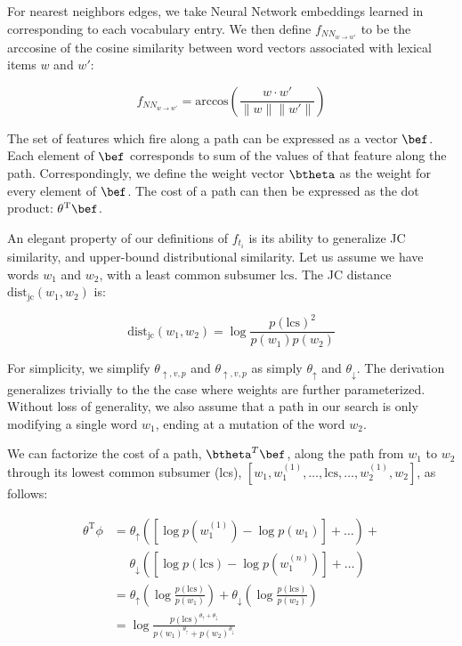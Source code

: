 For nearest neighbors edges, we take Neural Network embeddings learned
  in  corresponding to each vocabulary entry.
We then define $f_{NN_{w \rightarrow w'}}$
  to be the arccosine of the cosine similarity between word vectors
  associated with lexical items $w$ and $w'$:

\begin{equation*}
  f_{NN_{w \rightarrow w'}}
    = \textrm{arccos} \left( \frac{w \cdot w'}{\|w\| \|w'\|} \right)
\end{equation*}

The set of features which fire along a path
  can be expressed as a vector $\bef$.
Each element of $\bef$ corresponds to sum of the values of that
  feature along the path.
Correspondingly, we define the weight vector $\btheta$ as the
  weight for every element of $\bef$.
The cost of a path can then be expressed as the dot product:
  $\theta^{\textrm{T}}\bef$.

%
%
An elegant property of our definitions of $f_{t_i}$ is its ability to
  generalize JC similarity, and upper-bound distributional similarity.
Let us assume we have words $w_1$ and $w_2$, with a least common subsumer $\textrm{lcs}$.
The JC distance $\textrm{dist}_{\textrm{jc}}(w_1, w_2)$ is:

\begin{equation}
\textrm{dist}_{\textrm{jc}}(w_1, w_2)
  = \log\frac{p(\textrm{lcs})^2}{p(w_1)p(w_2)}
\label{eqn:jc}
\end{equation}

For simplicity, we simplify $\theta_{\uparrow,v,p}$ and $\theta_{\uparrow,v,p}$
  as simply $\theta_\uparrow$ and $\theta_\downarrow$.
The derivation generalizes trivially to the the case where weights are
  further parameterized.
Without loss of generality, we also assume that a path in our search
  is only modifying a single word $w_1$, ending at a mutation of the
  word $w_2$.

We can factorize the cost of a path, $\btheta^{T}\bef$, along the path
  from $w_1$ to $w_2$ through its lowest common subsumer (lcs),
  $[w_1, w_1^{(1)}, \dots, \textrm{lcs}, \dots,  w_2^{(1)}, w_2]$,
  as follows:

\begin{align*}
\theta^{\textrm{T}}\phi
  &= \theta_\uparrow \left( 
    \left[\log p(w_1^{(1)}) - \log p(w_1)\right] +
    \dots
    \right) + \\
  &~~~~~~ \theta_\downarrow \left( 
    \left[\log p(\textrm{lcs}) - \log p(w_1^{(n)}) \right] +
    \dots
    \right) \\
  &= \theta_\uparrow \left( \log \frac{p(\textrm{lcs})}{p(w_1)} \right) +
     \theta_\downarrow \left( \log \frac{p(\textrm{lcs})}{p(w_2)} \right) \\
  &= \log \frac{ p(\textrm{lcs})^{\theta_\uparrow + \theta_\downarrow} }
               { p(w_1)^{\theta_\uparrow} + p(w_2)^{\theta_\downarrow} }
\end{align*}

